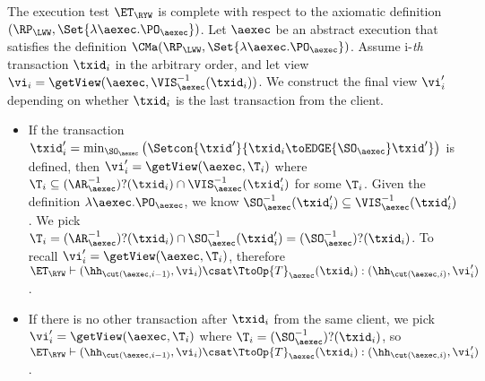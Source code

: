 The execution test $\ET_{\RYW}$ is complete with respect to 
the axiomatic definition $(\RP_{\LWW}, \Set{\lambda \aexec.\PO_{\aexec} })$. 
Let $\aexec$ be an abstract execution that satisfies the definition
$\CMa(\RP_{\LWW}, \Set{\lambda \aexec.\PO_{\aexec} })$.
Assume i-\emph{th} transaction \( \txid_i \) in the arbitrary order,
and let view \( \vi_{i} = \getView(\aexec, \VIS^{-1}_{\aexec}(\txid_{i}) ) \).
We construct the final view \( \vi'_i\) depending on whether \( \txid_i \) is the last transaction from the client.
\begin{itemize}
\item If the transaction \( \txid'_i = \min_{\SO_\aexec}\left(\Setcon{\txid'}{\txid_i \toEDGE{\SO_\aexec} \txid' } \right) \)  is defined,
then \( \vi'_i = \getView(\aexec, \T_i) \) where \( \T_i \subseteq (\AR_{\aexec}^{-1})?(\txid_i) \cap \VIS_\aexec^{-1}(\txid'_i) \) for some \( \T_i \).
Given the definition \( \lambda \aexec.\PO_{\aexec} \), 
we know \( \SO_\aexec^{-1}(\txid'_i) \subseteq \VIS_\aexec^{-1}(\txid'_i) \).
We pick \( \T_i = (\AR_\aexec^{-1})?(\txid_i) \cap \SO_\aexec^{-1}(\txid'_i) = (\SO_\aexec^{-1})?(\txid_i) \).
To recall \( \vi'_i = \getView(\aexec, \T_i) \), therefore \( \ET_\RYW \vdash (\hh_{\cut(\aexec, i-1)}, \vi_i) \csat \TtoOp{T}_{\aexec}(\txid_{i}) : (\hh_{\cut(\aexec, i)}, \vi'_{i}) \).
\item If there is no other transaction after \( \txid_i \) from the same client,
we pick \( \vi'_i = \getView(\aexec, \T_i) \) where \( \T_i = (\SO_\aexec^{-1})?(\txid_i) \),
so \( \ET_\RYW \vdash (\hh_{\cut(\aexec, i-1)}, \vi_i) \csat \TtoOp{T}_{\aexec}(\txid_{i}) : (\hh_{\cut(\aexec, i)}, \vi'_{i}) \).
\end{itemize}
